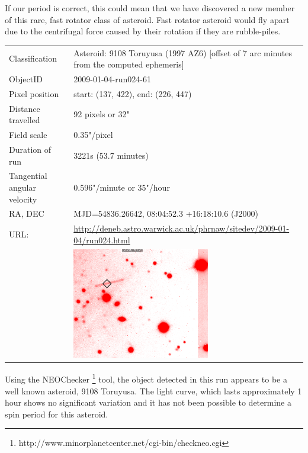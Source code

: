   If our period is correct, this could mean that we have discovered a new member of this rare, fast rotator class of asteroid. Fast rotator asteroid would fly apart due to the centrifugal force caused by their rotation if they are rubble-piles.


  \newpage
  \begin{tabular}{l l}
  Classification & Asteroid: 9108 Toruyusa (1997 AZ6) [offset of 7 arc minutes from the computed ephemeris]\\
  ObjectID & 2009-01-04-run024-61 \\
  Pixel position & start: (137, 422), end: (226, 447) \\
  Distance travelled & 92 pixels or 32" \\
  Field scale & 0.35"/pixel \\
  Duration of run & 3221s (53.7 minutes) \\
  Tangential angular velocity & 0.596"/minute or 35"/hour\\ 
  RA, DEC & MJD=54836.26642, 08:04:52.3 +16:18:10.6 (J2000) \\
  URL: & \small \url{http://deneb.astro.warwick.ac.uk/phrnaw/sitedev/2009-01-04/run024.html} \\
       & \includegraphics[width=60mm]{images/2009-01-04-run024-61.png} \\
  \end{tabular}

  Using the NEOChecker \footnote{http://www.minorplanetcenter.net/cgi-bin/checkneo.cgi} tool, the object detected in this run appears to be a well known asteroid, 9108 Toruyusa. The light curve, which lasts approximately 1 hour shows no significant variation and it has not been possible to determine a spin period for this asteroid.  

  
